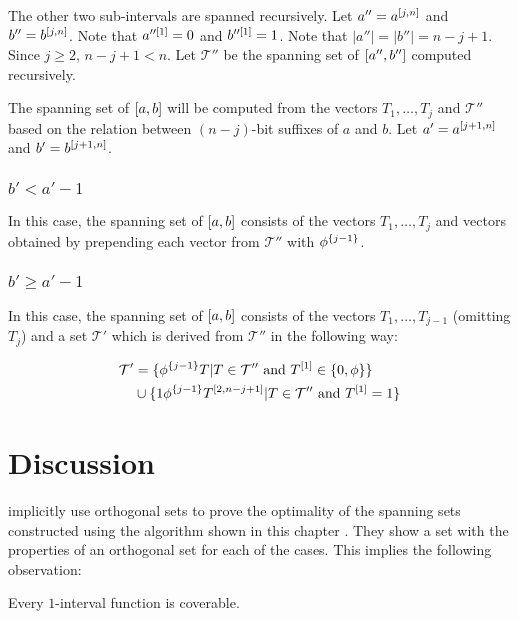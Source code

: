 The other two sub-intervals are spanned recursively.
Let $a'' = a^{[j, n]}$ and $b'' = b^{[j, n]}$.
Note that $a''^{[1]} = 0$ and $b''^{[1]} = 1$.
Note that $|a''| = |b''| = n - j + 1$.
Since $j \geq 2$, $n-j+1 < n$.
Let $\mathcal{T}''$ be the spanning set
of $[a'', b'']$ computed recursively.

The spanning set of $[a, b]$ will be computed
from the vectors $T_1, \ldots, T_j$ and $\mathcal{T}''$
based on the relation between $(n-j)$-bit suffixes of $a$
and $b$.
Let $a' = a^{[j+1, n]}$ and $b' = b^{[j+1, n]}$.

\subsubsection{\texorpdfstring
{$b' < a' - 1$}
{b' < a' - 1}
}

In this case,
the spanning set of $[a, b]$ consists
of the vectors $T_1, \ldots, T_j$ and vectors obtained
by prepending each vector from $\mathcal{T}''$ with
$\phi^{\{j-1\}}$.

\subsubsection{\texorpdfstring
{$b' \geq a' - 1$}
{b' >= a' - 1}
}

In this case,
the spanning set of $[a, b]$ consists
of the vectors $T_1, \ldots, T_{j-1}$ (omitting $T_j$)
and a set $\mathcal{T}'$ which is derived
from $\mathcal{T}''$
in the following way:

\begin{align*}
\mathcal{T}' &= \{
\phi^{\{j-1\}} T | T \in \mathcal{T}'' \text{ and }
T^{[1]} \in \{0, \phi\}
\} \\
&\cup \{
1 \phi^{\{j-1\}} T^{[2, n-j+1]} | T \in \mathcal{T}''
\text{ and } T^{[1]} = 1
\}
\end{align*}


\section{Discussion}
\label{sec:1intervaldiscussion}

\citeauthor{Schieber2005154} implicitly use
orthogonal sets
to prove the optimality
of the spanning sets
constructed using the algorithm shown in this chapter
\citep[Theorem 3]{Schieber2005154}.
They show a set with the properties of an orthogonal set
for each of the cases.
This implies the following observation:
\begin{observation}
\label{observation:1intervalcoverable}
Every $1$-interval function is coverable.
\end{observation}

